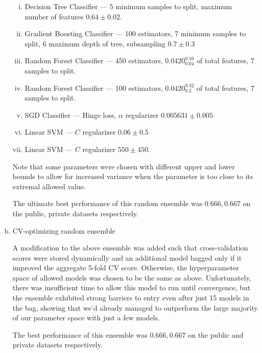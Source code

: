 \documentclass[10pt]{article}
\begin{document}
\begin{enumerate}[a)]
\begin{enumerate}[i.]
            \item Decision Tree Classifier --- 5 minimum samples to split, maximum number of features $0.64 \pm 0.02$.

            \item Gradient Boosting Classifier --- 100 estimators, 7 minimum samples to split, 6 maximum depth of tree, subsampling $0.7 \pm 0.3$
            \item Random Forest Classifier --- 450 estimators, $0.0420^{0.16}_{0.04}$ of total features, 7 samples to split.
            \item Random Forest Classifier --- 100 estimators, $0.0420^{0.32}_{0.2}$ of total features, 7 samples to split.

            \item SGD Classifier --- Hinge loss, $\alpha$ regularizer $0.005631 \pm 0.005$
            \item Linear SVM --- $C$ regularizer $0.06 \pm 0.5$

            \item Linear SVM --- $C$ regularizer $550 \pm 450$.
    \end{enumerate}

        Note that some parameters were chosen with different upper and lower bounds to allow for increased variance when the parameter is too close to its extremal allowed value.

        The ultimate best performance of this random ensemble was $0.666, 0.667$ on the public, private datasets respectively.

    \item CV-optimizing random ensemble

        A modification to the above ensemble was added such that cross-validation scores were stored dynamically and an additional model bagged only if it improved the aggregate 5-fold CV score. Otherwise, the hyperparameter space of allowed models was chosen to be the same as above. Unfortunately, there was insufficient time to allow this model to run until convergence, but the ensemble exhibited strong barriers to entry even after just 15 models in the bag, showing that we'd already managed to outperform the large majority of our parameter space with just a few models.

        The best performance of this ensemble was $0.666, 0.667$ on the public and private datasets respectively.

\end{enumerate}
\end{document}
